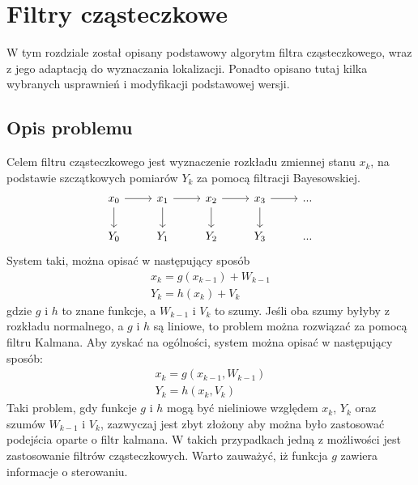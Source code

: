 \chapter{Filtry cząsteczkowe}
W tym rozdziale został opisany podstawowy algorytm filtra cząsteczkowego, wraz z jego adaptacją do wyznaczania lokalizacji. Ponadto opisano tutaj kilka wybranych usprawnień i modyfikacji podstawowej wersji.
\section{Opis problemu}
Celem filtru cząsteczkowego jest wyznaczenie rozkładu zmiennej stanu $x_k$, na podstawie szczątkowych pomiarów $Y_k$ za pomocą filtracji Bayesowskiej. \\
\begin{equation*}
\begin{tikzcd}
	x_0 \arrow{r} \arrow{d} &x_1 \arrow{r} \arrow{d} &x_2 \arrow{r} \arrow{d} &x_3\arrow{r} \arrow{d} &...\\
	Y_0 &Y_1 &Y_2 &Y_3 &...
\end{tikzcd} 
\end{equation*}
System taki, można opisać w następujący sposób
\begin{equation*}
	\begin{aligned}
		x_k=g(x_{k-1})+W_{k-1} \\
		Y_k=h(x_k)+V_k
	\end{aligned}
\end{equation*}
gdzie $g$ i $h$ to znane funkcje, a $W_{k-1}$ i $V_k$ to szumy. Jeśli oba szumy byłyby z rozkładu normalnego, a $g$ i $h$ są liniowe, to problem można rozwiązać za pomocą filtru Kalmana. Aby zyskać na ogólności, system można opisać w następujący sposób:
\begin{equation} \label{problem_eq}
	\begin{aligned}
		x_k=g(x_{k-1}, W_{k-1}) \\
		Y_k=h(x_k, V_k)
	\end{aligned}
\end{equation}
Taki problem, gdy funkcje $g$ i $h$ mogą być nieliniowe względem $x_k$, $Y_k$ oraz szumów $W_{k-1}$ i $V_k$, zazwyczaj jest zbyt złożony aby można było zastosować podejścia oparte o filtr kalmana. W takich przypadkach jedną z możliwości jest zastosowanie filtrów cząsteczkowych. Warto zauważyć, iż funkcja $g$ zawiera informacje o sterowaniu.
